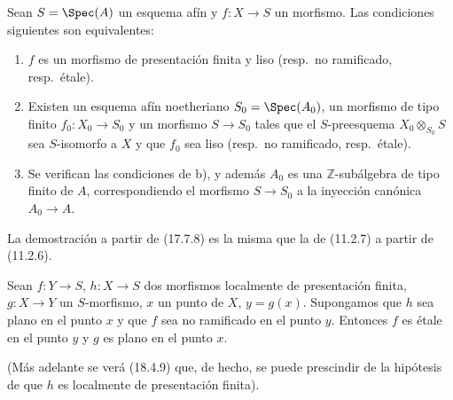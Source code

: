 \begin{corollary}[17.7.9]
\label{IV.17.7.9}
Sean $S=\Spec(A)$ un esquema afín y $f:X\to S$ un morfismo. Las condiciones siguientes son equivalentes:
\begin{enumerate}
  \item[\textup{a)}] $f$ es un morfismo de presentación finita y liso \textup{(resp.}\ no ramificado, \textup{resp.}\ étale\textup{)}.


  \item[\textup{b)}] Existen un esquema afín noetheriano $S_0=\Spec(A_0)$, un morfismo de tipo finito $f_0:X_0\to S_0$ y un morfismo $S\to S_0$ tales que el $S$-preesquema $X_0\otimes_{S_0}S$ sea $S$-isomorfo a $X$ y que $f_0$ sea liso \textup{(resp.}\ no ramificado, \textup{resp.}\ étale\textup{)}.
  \item[\textup{c)}] Se verifican las condiciones de \textup{b)}, y además $A_0$ es una $\mathbb{Z}$-subálgebra de tipo finito de $A$, correspondiendo el morfismo $S\to S_0$ a la inyección canónica $A_0\to A$.
\end{enumerate}
\end{corollary}

La demostración a partir de (17.7.8) es la misma que la de (11.2.7) a partir de (11.2.6).

\begin{proposition}[17.7.10]
\label{IV.17.7.10}
Sean $f:Y\to S$, $h:X\to S$ dos morfismos localmente de presentación finita, $g:X\to Y$ un $S$-morfismo, $x$ un punto de $X$, $y=g(x)$. Supongamos que $h$ sea \textup{plano} en el punto $x$ y que $f$ sea \textup{no ramificado} en el punto $y$. Entonces $f$ es \textup{étale} en el punto $y$ y $g$ es \textup{plano} en el punto $x$.
\end{proposition}

(Más adelante se verá (18.4.9) que, de hecho, se puede prescindir de la hipótesis de que $h$ es localmente de presentación finita).

